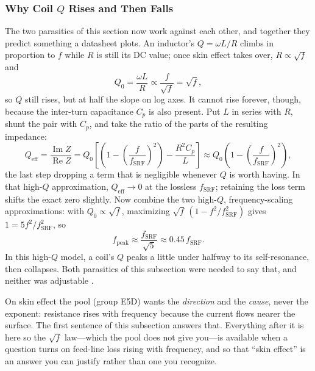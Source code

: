 \subsubsection*{Why Coil \texorpdfstring{\(Q\)}{Q} Rises and Then Falls}
The two parasitics of this section now work against each other, and together they
predict something a datasheet plots. An inductor's \(Q=\omega L/R\) climbs in
proportion to \(f\) while \(R\) is still its DC value; once skin effect takes over,
\(R\propto\sqrt f\) and
\[
Q_0=\frac{\omega L}{R}\propto\frac{f}{\sqrt f}=\sqrt f ,
\]
so \(Q\) still rises, but at half the slope on log axes. It cannot rise forever,
though, because the inter-turn capacitance \(C_p\) is also present. Put \(L\) in
series with \(R\), shunt the pair with \(C_p\), and take the ratio of the parts of the
resulting impedance:
\[
Q_{\mathrm{eff}}=\frac{\operatorname{Im}Z}{\operatorname{Re}Z}
=Q_0\left[\left(1-\left(\frac{f}{f_{\mathrm{SRF}}}\right)^{2}\right)-\frac{R^2C_p}{L}\right]
\approx Q_0\left(1-\left(\frac{f}{f_{\mathrm{SRF}}}\right)^{2}\right),
\]
the last step dropping a term that is negligible whenever \(Q\) is worth having. In
that high-\(Q\) approximation, \(Q_{\mathrm{eff}}\to0\) at the lossless
\(f_{\mathrm{SRF}}\); retaining the loss term shifts the exact zero slightly. Now
combine the two high-\(Q\), frequency-scaling approximations: with
\(Q_0\propto\sqrt f\), maximizing \(\sqrt f\,(1-f^2/f_{\mathrm{SRF}}^2)\) gives
\(1=5f^2/f_{\mathrm{SRF}}^2\), so
\[
f_{\text{peak}}\approx\frac{f_{\mathrm{SRF}}}{\sqrt5}\approx0.45\,f_{\mathrm{SRF}} .
\]
In this high-\(Q\) model, a coil's \(Q\) peaks a little under halfway to its
self-resonance, then collapses. Both parasitics of this subsection were needed to
say that, and neither was adjustable \cite[pp.~7--9]{bowick2008rfcircuit}.

\begin{exambox}
On skin effect the pool (group E5D) wants the \emph{direction} and the \emph{cause},
never the exponent: resistance rises with frequency because the current flows nearer
the surface. The first sentence of this subsection answers that. Everything after it
is here so the \(\sqrt f\) law---which the pool does not give you---is available when
a question turns on feed-line loss rising with frequency, and so that ``skin effect''
is an answer you can justify rather than one you recognize.
\end{exambox}

